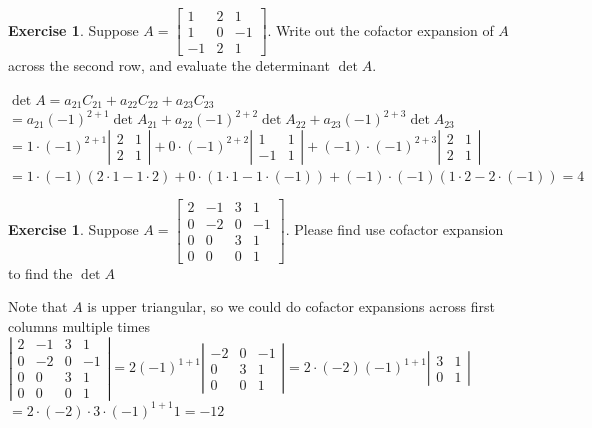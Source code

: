\documentclass{beamer}
\theoremstyle{definition}
\newtheorem{exercise}[theorem]{Exercise}
\theoremstyle{remark}
\begin{document}
\begin{frame}[t]
\begin{exercise}
Suppose $A=\begin{bmatrix}
1&2&1\\
1&0&-1\\
-1&2&1
\end{bmatrix}$. Write out the cofactor expansion of $A$ across the second row, and evaluate the determinant $\det A$.
\end{exercise}
\pause
\begin{solution}
$\det A=a_{21}C_{21}+a_{22}C_{22}+a_{23}C_{23}$\\\pause
$=a_{21}(-1)^{2+1}\det A_{21}+a_{22}(-1)^{2+2}\det A_{22}+a_{23}(-1)^{2+3}\det A_{23}$\\\pause
$=1\cdot(-1)^{2+1}\left|\begin{matrix}
2&1\\2&1
\end{matrix}\right|+0\cdot(-1)^{2+2}\left|\begin{matrix}
1&1\\-1&1
\end{matrix}\right|+(-1)\cdot(-1)^{2+3}\left|\begin{matrix}
2&1\\2&1
\end{matrix}\right|$\\
$=1\cdot(-1)(2\cdot1-1\cdot2)+0\cdot(1\cdot1-1\cdot(-1))+(-1)\cdot(-1)(1\cdot2-2\cdot(-1))=4$
\end{solution}
\end{frame}

\begin{frame}[t]
\begin{exercise}
Suppose $A=\begin{bmatrix}
2&-1&3&1\\
0&-2&0&-1\\
0&0&3&1\\
0&0&0&1
\end{bmatrix}$. Please find use cofactor expansion  to find the $\det A$
\end{exercise}

\begin{solution}
Note that $A$ is upper triangular, so we could do cofactor expansions across first columns multiple times
$\left|\begin{matrix}
2&-1&3&1\\
0&-2&0&-1\\
0&0&3&1\\
0&0&0&1
\end{matrix}\right|=2(-1)^{1+1}\left|\begin{matrix}
-2&0&-1\\
0&3&1\\
0&0&1
\end{matrix}\right|=2\cdot(-2)(-1)^{1+1}\left|\begin{matrix}
3&1\\
0&1
\end{matrix}\right|$\\
$=2\cdot(-2)\cdot3\cdot(-1)^{1+1}1=-12$
\end{solution}
\end{frame}
\end{document}
